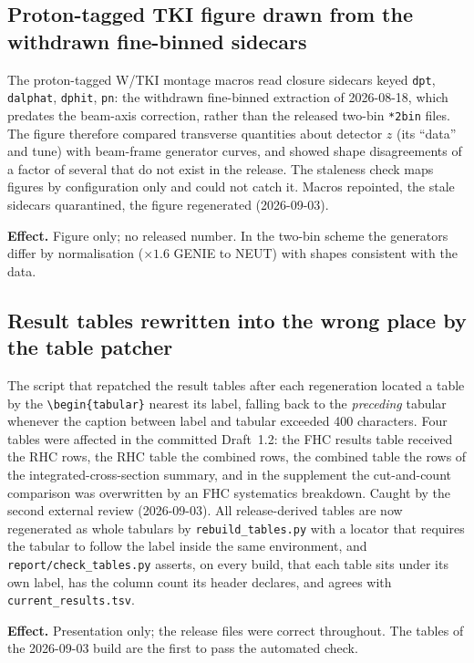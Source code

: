 \subsection{Proton-tagged TKI figure drawn from the withdrawn fine-binned sidecars}

The proton-tagged W/TKI montage macros read closure sidecars keyed \texttt{dpt},
\texttt{dalphat}, \texttt{dphit}, \texttt{pn}: the withdrawn fine-binned extraction of
2026-08-18, which predates the beam-axis correction, rather than the released two-bin
\texttt{*2bin} files.  The figure therefore compared transverse quantities about detector
$z$ (its ``data'' and tune) with beam-frame generator curves, and showed shape
disagreements of a factor of several that do not exist in the release.  The staleness
check maps figures by configuration only and could not catch it.  Macros repointed, the
stale sidecars quarantined, the figure regenerated (2026-09-03).

\textbf{Effect.}  Figure only; no released number.  In the two-bin scheme the generators
differ by normalisation ($\times1.6$ GENIE to NEUT) with shapes consistent with the data.

\subsection{Result tables rewritten into the wrong place by the table patcher}

The script that repatched the result tables after each regeneration located a table by
the \texttt{\textbackslash begin\{tabular\}} nearest its label, falling back to the
\emph{preceding} tabular whenever the caption between label and tabular exceeded 400
characters.  Four tables were affected in the committed Draft~1.2: the FHC results table
received the RHC rows, the RHC table the combined rows, the combined table the rows of the
integrated-cross-section summary, and in the supplement the cut-and-count comparison was
overwritten by an FHC systematics breakdown.  Caught by the second external review
(2026-09-03).  All release-derived tables are now regenerated as whole tabulars by
\texttt{rebuild\_tables.py} with a locator that requires the tabular to follow the label
inside the same environment, and \texttt{report/check\_tables.py} asserts, on every build,
that each table sits under its own label, has the column count its header declares, and
agrees with \texttt{current\_results.tsv}.

\textbf{Effect.}  Presentation only; the release files were correct throughout.  The
tables of the 2026-09-03 build are the first to pass the automated check.

